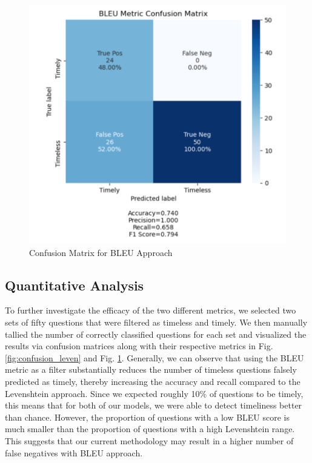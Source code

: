 \documentclass{article}
\begin{document}
\begin{figure}[t!]
	\begin{center}
		\includegraphics[scale=0.5]{bleu.PNG}
	\end{center}
	\caption{Confusion Matrix for BLEU Approach}
	\label{fig:confusion_bleu}
\end{figure}

\subsection{Quantitative Analysis}

To further investigate the efficacy of the two different metrics, we selected
two sets of fifty questions that were filtered as timeless and timely. We then
manually tallied the number of correctly classified questions for each set and
visualized the results via confusion matrices along with their respective
metrics in Fig. \ref{fig:confusion_leven} and Fig. \ref{fig:confusion_bleu}.
Generally, we can observe that using the BLEU metric as a filter substantially
reduces the number of timeless questions falsely predicted as timely, thereby
increasing the accuracy and recall compared to the Levenshtein approach. Since
we expected roughly 10\% of questions to be timely, this means that for both of
our models, we were able to detect timeliness better than chance. However, the
proportion of questions with a low BLEU score is much smaller than the
proportion of questions with a high Levenshtein range. This suggests that our
current methodology may result in a higher number of false negatives with BLEU
approach.
\end{document}
